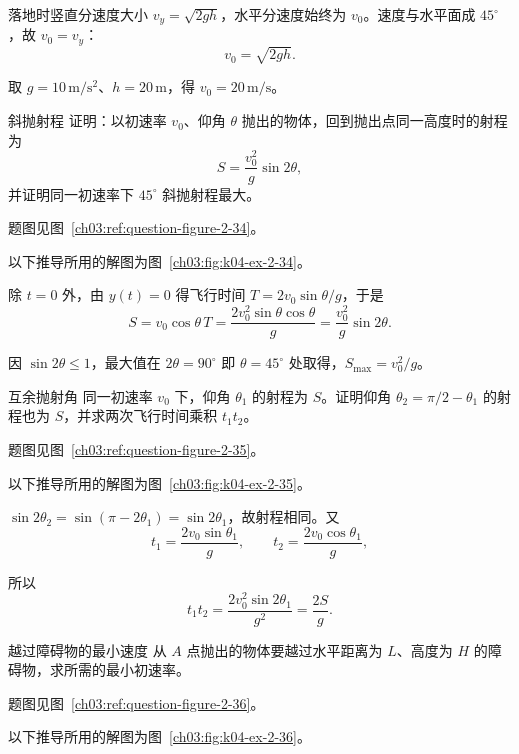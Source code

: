 {\begin{xesolution}
落地时竖直分速度大小 $v_y=\sqrt{2gh}$，水平分速度始终为 $v_0$。速度与水平面成 $45^\circ$，故 $v_0=v_y$：
\[
 \boxed{v_0=\sqrt{2gh}}.
\]
\HorizontalThrowImpactDiagram

取 $g=10\,\mathrm{m/s^2}$、$h=20\,\mathrm m$，得 $\boxed{v_0=20\,\mathrm{m/s}}$。
\end{xesolution}

\begin{origexamplebox}{斜抛射程}\label{ch03:ex:k04-2-34}
证明：以初速率 $v_0$、仰角 $\theta$ 抛出的物体，回到抛出点同一高度时的射程为
\[
 S=\frac{v_0^2}{g}\sin2\theta,
\]
并证明同一初速率下 $45^\circ$ 斜抛射程最大。
\par 题图见图~\ref{ch03:ref:question-figure-2-34}。
\KQuestionBI
\end{origexamplebox}
\begin{xesolution}
以下推导所用的解图为图~\ref{ch03:fig:k04-ex-2-34}。

除 $t=0$ 外，由 $y(t)=0$ 得飞行时间 $T=2v_0\sin\theta/g$，于是
\[
 S=v_0\cos\theta\,T
 =\frac{2v_0^2\sin\theta\cos\theta}{g}
 =\boxed{\frac{v_0^2}{g}\sin2\theta}.
\]
\ProjectileRangeDiagram

因 $\sin2\theta\le1$，最大值在 $2\theta=90^\circ$ 即 $\boxed{\theta=45^\circ}$ 处取得，$S_{\max}=v_0^2/g$。
\end{xesolution}


\begin{origexamplebox}{互余抛射角}\label{ch03:ex:k04-2-35}
同一初速率 $v_0$ 下，仰角 $\theta_1$ 的射程为 $S$。证明仰角 $\theta_2=\pi/2-\theta_1$ 的射程也为 $S$，并求两次飞行时间乘积 $t_1t_2$。
\par 题图见图~\ref{ch03:ref:question-figure-2-35}。
\KQuestionBJ
\end{origexamplebox}
\begin{xesolution}
以下推导所用的解图为图~\ref{ch03:fig:k04-ex-2-35}。

$\sin2\theta_2=\sin(\pi-2\theta_1)=\sin2\theta_1$，故射程相同。又
\[
t_1=\frac{2v_0\sin\theta_1}{g},\qquad
t_2=\frac{2v_0\cos\theta_1}{g},
\]
\ComplementaryProjectileDiagram

所以
\[
 t_1t_2=\frac{2v_0^2\sin2\theta_1}{g^2}
 =\boxed{\frac{2S}{g}}.
\]
\end{xesolution}

\begin{origexamplebox}{越过障碍物的最小速度}\label{ch03:ex:k04-2-36}
从 $A$ 点抛出的物体要越过水平距离为 $L$、高度为 $H$ 的障碍物，求所需的最小初速率。
\par 题图见图~\ref{ch03:ref:question-figure-2-36}。
\KQuestionBK
\end{origexamplebox}
\begin{xesolution}
以下推导所用的解图为图~\ref{ch03:fig:k04-ex-2-36}。


\end{xesolution}}
